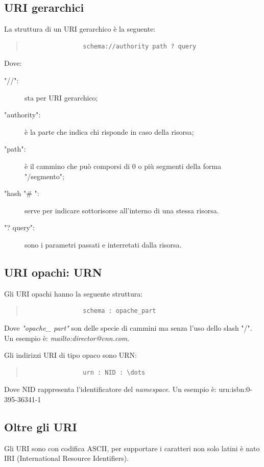 		\subsection{URI gerarchici}
			La struttura di un URI gerarchico è la seguente:
			\begin{quote}
			\begin{verbatim}
				schema://authority path ? query
			\end{verbatim}
			\end{quote}
			Dove:
			\begin{description}
				\item["//":] sta per URI gerarchico;
				\item["authority":] è la parte che indica chi risponde in caso della risorsa;
				\item["path":] è il cammino che può comporsi di 0 o più segmenti della forma "/segmento";
				\item["hash "\# ":] serve per indicare sottorisorse all'interno di una stessa risorsa.
				\item["? query":] sono i parametri passati e interretati dalla risorsa.
			\end{description}
		
		\subsection{URI opachi: URN}
			Gli URI opachi hanno la seguente struttura:
			\begin{quote}
			\begin{verbatim}
				schema : opache_part
			\end{verbatim}
			\end{quote}
			
			Dove \emph{"opache\_ part"} son delle specie di cammini ma senza l'uso dello slash "/". Un esempio è: \emph{mailto:director@cnn.com}.
			
			Gli indirizzi URI di tipo opaco sono URN:
			\begin{quote}
			\begin{verbatim}
				urn : NID : \dots
			\end{verbatim}
			\end{quote}
			Dove NID rappresenta l'identificatore del \emph{namespace}.
			Un esempio è: urn:isbn:0-395-36341-1
		
		\subsection{Oltre gli URI}
			Gli URI sono con codifica ASCII, per supportare i caratteri non solo latini è nato IRI (International Resource Identifiers).
		
